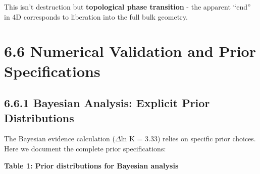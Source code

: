 \documentclass[
  11pt,
]{report}
\begin{document}
This isn't destruction but \textbf{topological phase transition} - the
apparent ``end'' in 4D corresponds to liberation into the full bulk
geometry.

\section{6.6 Numerical Validation and Prior
Specifications}\label{numerical-validation-and-prior-specifications}

\subsection{6.6.1 Bayesian Analysis: Explicit Prior
Distributions}\label{bayesian-analysis-explicit-prior-distributions}

The Bayesian evidence calculation (\(\Delta\)ln K = 3.33) relies on
specific prior choices. Here we document the complete prior
specifications:

\textbf{Table 1: Prior distributions for Bayesian analysis}
\end{document}
